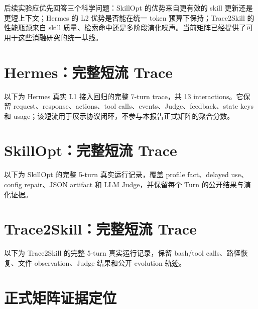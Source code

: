 \documentclass[11pt,a4paper]{article}
\begin{document}
后续实验应优先回答三个科学问题：SkillOpt 的优势来自更有效的 skill 更新还是更短上下文；Hermes 的 L2 优势是否能在统一 token 预算下保持；Trace2Skill 的性能瓶颈来自 skill 质量、检索命中还是多阶段演化噪声。当前矩阵已经提供了可用于这些消融研究的统一基线。

\clearpage
\appendix
\section{Hermes：完整短流 Trace}

以下为 Hermes 真实 L1 接入回归的完整 7-turn trace，共 13 interactions。它保留 request、response、actions、tool calls、events、Judge、feedback、state keys 和 usage；该短流用于展示协议闭环，不参与本报告正式矩阵的聚合分数。



\clearpage
\section{SkillOpt：完整短流 Trace}

以下为 SkillOpt 的完整 5-turn 真实运行记录，覆盖 profile fact、delayed use、config repair、JSON artifact 和 LLM Judge，并保留每个 Turn 的公开结果与演化证据。



\clearpage
\section{Trace2Skill：完整短流 Trace}

以下为 Trace2Skill 的完整 5-turn 真实运行记录，保留 bash/tool calls、路径恢复、文件 observation、Judge 结果和公开 evolution 轨迹。



\clearpage
\section{正式矩阵证据定位}
\end{document}
